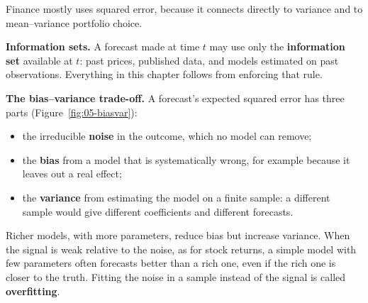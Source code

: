 Finance mostly uses squared error, because it connects directly to variance and to mean--variance portfolio choice.

\textbf{Information sets.} A forecast made at time $t$ may use only the \textbf{information set} available at $t$: past prices, published data, and models estimated on past observations. Everything in this chapter follows from enforcing that rule.

\textbf{The bias--variance trade-off.} A forecast's expected squared error has three parts (Figure~\ref{fig:05-biasvar}):

\begin{itemize}
  \item the irreducible \textbf{noise} in the outcome, which no model can remove;
  \item the \textbf{bias} from a model that is systematically wrong, for example because it leaves out a real effect;
  \item the \textbf{variance} from estimating the model on a finite sample: a different sample would give different coefficients and different forecasts.
\end{itemize}

Richer models, with more parameters, reduce bias but increase variance. When the signal is weak relative to the noise, as for stock returns, a simple model with few parameters often forecasts better than a rich one, even if the rich one is closer to the truth. Fitting the noise in a sample instead of the signal is called \textbf{overfitting}.


